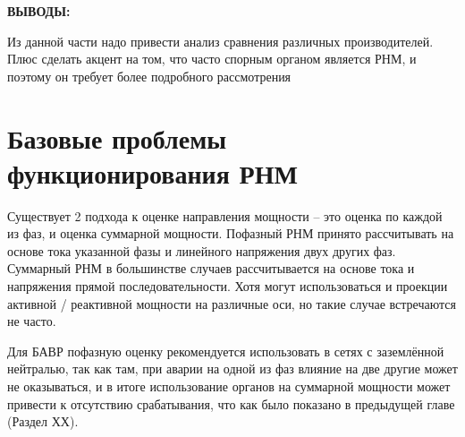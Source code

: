 \par\vspace{0.2cm}
\noindent\textbf{ВЫВОДЫ:}\par\vspace{0.2cm}
Из данной части надо привести анализ сравнения различных производителей. Плюс сделать
акцент на том, что часто спорным органом является РНМ, и поэтому он требует более
подробного рассмотрения\par\vspace{0.3cm}

\par\vspace{0.3cm}
\section{Базовые проблемы функционирования РНМ}\label{sec:ch1_pdr_problems}

Существует 2 подхода к оценке направления мощности – это оценка по каждой из фаз, и
оценка суммарной мощности. Пофазный РНМ принято рассчитывать на основе тока указанной
фазы и линейного напряжения двух других фаз. Суммарный РНМ в большинстве случаев
рассчитывается на основе тока и напряжения прямой последовательности. Хотя могут
использоваться и проекции активной / реактивной мощности на различные оси, но такие
случае встречаются не часто.\par\vspace{0.2cm}

Для БАВР пофазную оценку рекомендуется использовать в сетях с заземлённой нейтралью, так как там, при аварии на одной из фаз влияние на две другие может не оказываться, и в итоге использование органов на суммарной мощности может привести к отсутствию срабатывания, что как было показано в предыдущей главе (Раздел ХХ).\par\vspace{0.2cm}

\noindent{}\par\vspace{0.2cm}

